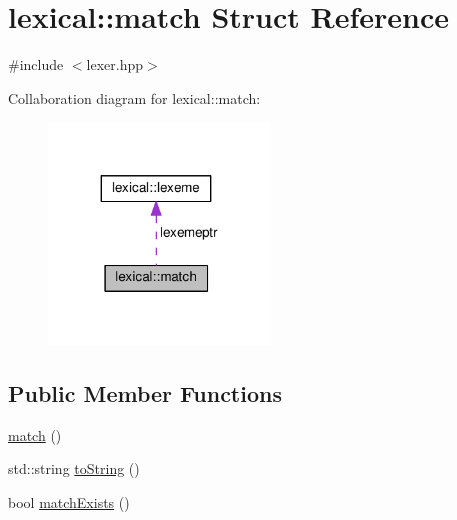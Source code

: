 \hypertarget{structlexical_1_1match}{}\section{lexical\+:\+:match Struct Reference}
\label{structlexical_1_1match}


{\ttfamily \#include $<$lexer.\+hpp$>$}



Collaboration diagram for lexical\+:\+:match\+:\nopagebreak
\begin{figure}[H]
\begin{center}
\leavevmode
\includegraphics[width=167pt]{structlexical_1_1match__coll__graph}
\end{center}
\end{figure}
\subsection*{Public Member Functions}
\begin{DoxyCompactItemize}
\item 
\hyperlink{structlexical_1_1match_ace4aee5410296a2cfca192700098891a}{match} ()
\item 
std\+::string \hyperlink{structlexical_1_1match_a09ae2bd81b43191fa58ce13c2245b6f9}{to\+String} ()
\item 
bool \hyperlink{structlexical_1_1match_aafa3ddcad89ea3abb86b557cafe3e0d7}{match\+Exists} ()
\end{DoxyCompactItemize}
